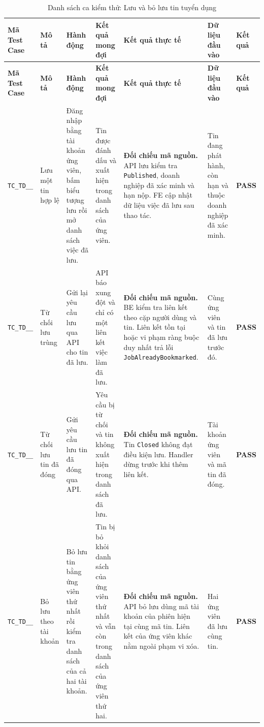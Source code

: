 \begin{landscape}
{
\fontsize{9.5}{11.5}\selectfont
\setlength{\tabcolsep}{3pt}
\renewcommand{\arraystretch}{1.2}
\begin{longtable}{|>{\raggedright\arraybackslash}p{2.1cm}|>{\raggedright\arraybackslash}p{2.8cm}|>{\raggedright\arraybackslash}p{3.8cm}|>{\raggedright\arraybackslash}p{4.0cm}|>{\raggedright\arraybackslash}p{5.0cm}|>{\raggedright\arraybackslash}p{3.2cm}|>{\centering\arraybackslash}p{1.3cm}|}
    \caption{Danh sách ca kiểm thử: Lưu và bỏ lưu tin tuyển dụng} \label{tab:ts-td-02} \\
    \hline
    \textbf{Mã Test Case} & \textbf{Mô tả} & \textbf{Hành động} & \textbf{Kết quả mong đợi} & \textbf{Kết quả thực tế} & \textbf{Dữ liệu đầu vào} & \textbf{Kết quả} \\
    \hline
    \endfirsthead
    \hline
    \textbf{Mã Test Case} & \textbf{Mô tả} & \textbf{Hành động} & \textbf{Kết quả mong đợi} & \textbf{Kết quả thực tế} & \textbf{Dữ liệu đầu vào} & \textbf{Kết quả} \\
    \hline
    \endhead
    \hline
    \endfoot
    \hline
    \endlastfoot
    \texttt{TC\_\allowbreak TD\_\allowbreak 02\_\allowbreak 01} & Lưu một tin hợp lệ & Đăng nhập bằng tài khoản ứng viên, bấm biểu tượng lưu rồi mở danh sách việc đã lưu. & Tin được đánh dấu và xuất hiện trong danh sách của ứng viên. & \textbf{Đối chiếu mã nguồn.} API lưu kiểm tra \texttt{Published}, doanh nghiệp đã xác minh và hạn nộp. FE cập nhật dữ liệu việc đã lưu sau thao tác. & Tin đang phát hành, còn hạn và thuộc doanh nghiệp đã xác minh. & \textbf{PASS} \\
    \hline
    \texttt{TC\_\allowbreak TD\_\allowbreak 02\_\allowbreak 02} & Từ chối lưu trùng & Gửi lại yêu cầu lưu qua API cho tin đã lưu. & API báo xung đột và chỉ có một liên kết việc làm đã lưu. & \textbf{Đối chiếu mã nguồn.} BE kiểm tra liên kết theo cặp người dùng và tin. Liên kết tồn tại hoặc vi phạm ràng buộc duy nhất trả lỗi \texttt{JobAlreadyBookmarked}. & Cùng ứng viên và tin đã lưu trước đó. & \textbf{PASS} \\
    \hline
    \texttt{TC\_\allowbreak TD\_\allowbreak 02\_\allowbreak 03} & Từ chối lưu tin đã đóng & Gửi yêu cầu lưu tin đã đóng qua API. & Yêu cầu bị từ chối và tin không xuất hiện trong danh sách đã lưu. & \textbf{Đối chiếu mã nguồn.} Tin \texttt{Closed} không đạt điều kiện lưu. Handler dừng trước khi thêm liên kết. & Tài khoản ứng viên và mã tin đã đóng. & \textbf{PASS} \\
    \hline
    \texttt{TC\_\allowbreak TD\_\allowbreak 02\_\allowbreak 04} & Bỏ lưu theo tài khoản & Bỏ lưu tin bằng ứng viên thứ nhất rồi kiểm tra danh sách của cả hai tài khoản. & Tin bị bỏ khỏi danh sách của ứng viên thứ nhất và vẫn còn trong danh sách của ứng viên thứ hai. & \textbf{Đối chiếu mã nguồn.} API bỏ lưu dùng mã tài khoản của phiên hiện tại cùng mã tin. Liên kết của ứng viên khác nằm ngoài phạm vi xóa. & Hai ứng viên đã lưu cùng tin. & \textbf{PASS} \\
    \hline
\end{longtable}
}


\end{landscape}
